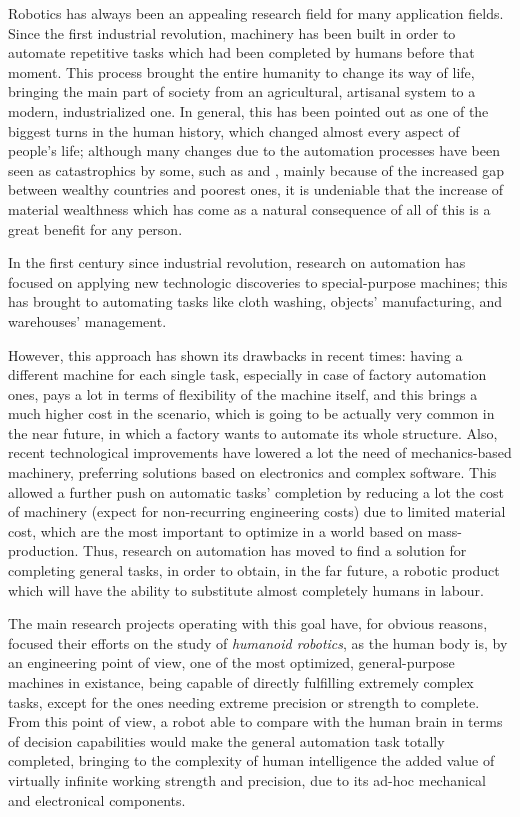 Robotics has always been an appealing research field for many
application fields. Since the first industrial revolution, machinery
has been built in order to automate repetitive tasks which had been
completed by humans before that moment. This process brought the
entire humanity to change its way of life, bringing the main part of
society from an agricultural, artisanal system to a modern,
industrialized one. In general, this has been pointed out as one of
the biggest turns in the human history, which changed almost every
aspect of people's life; although many changes due to the automation
processes have been seen as catastrophics by some, such as
\cite{bombarolo} and \cite{extinction}, mainly because of the
increased gap between wealthy countries and poorest ones, it is
undeniable that the increase of material wealthness which has come as a natural
consequence of all of this is a great benefit for any person.

In the first century since industrial revolution, research on
automation has focused on applying new technologic discoveries to
special-purpose machines; this has brought to automating tasks like
cloth washing, objects' manufacturing, and warehouses' management.

However, this approach has shown its drawbacks in recent times: having
a different machine for each single task, especially in case of
factory automation ones, pays a lot in terms of flexibility of the
machine itself, and this brings a much higher cost in the scenario,
which is going to be actually very common in the near future, in which
a factory wants to automate its whole structure. Also, recent
technological improvements have lowered a lot the need of
mechanics-based machinery, preferring solutions based on electronics
and complex software. This allowed a further push on automatic tasks'
completion by reducing a lot the cost of machinery (expect for
non-recurring engineering costs) due to limited material cost, which
are the most important to optimize in a world based on
mass-production. Thus, research on automation has moved to find a
solution for completing general tasks, in order to obtain, in the far
future, a robotic product which will have the ability to substitute
almost completely humans in labour.

The main research projects operating with this goal have, for obvious
reasons, focused their efforts on the study of \emph{humanoid
  robotics}, as the human body is, by an engineering point of view,
one of the most optimized, general-purpose machines in existance,
being capable of directly fulfilling extremely complex tasks, except for the
ones needing extreme precision or strength to complete. From this point of view, a
robot able to compare with the human brain in terms of decision capabilities
would make the general automation task totally completed, bringing to
the complexity of human intelligence the added value of virtually
infinite working strength and precision, due to its ad-hoc mechanical
and electronical components.

